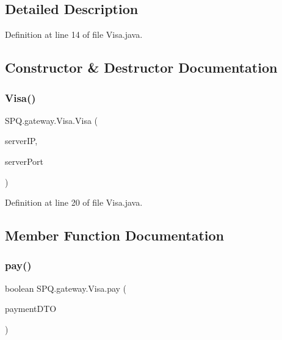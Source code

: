 \subsection{Detailed Description}


Definition at line 14 of file Visa.\+java.



\subsection{Constructor \& Destructor Documentation}
\mbox{\label{class_s_p_q_1_1gateway_1_1_visa_ae3db27f4e13da7b9d7d9496a1b5eeb91}} 
\subsubsection{\texorpdfstring{Visa()}{Visa()}}
{\footnotesize\ttfamily S\+P\+Q.\+gateway.\+Visa.\+Visa (\begin{DoxyParamCaption}\item[{String}]{server\+IP,  }\item[{String}]{server\+Port }\end{DoxyParamCaption})}



Definition at line 20 of file Visa.\+java.



\subsection{Member Function Documentation}
\mbox{\label{class_s_p_q_1_1gateway_1_1_visa_a0ecda0414a0685174ec12ae96c8d3a68}} 
\subsubsection{\texorpdfstring{pay()}{pay()}}
{\footnotesize\ttfamily boolean S\+P\+Q.\+gateway.\+Visa.\+pay (\begin{DoxyParamCaption}\item[{\mbox{\hyperlink{class_s_p_q_1_1dto_1_1_payment_d_t_o}{Payment\+D\+TO}}}]{payment\+D\+TO }\end{DoxyParamCaption})}



